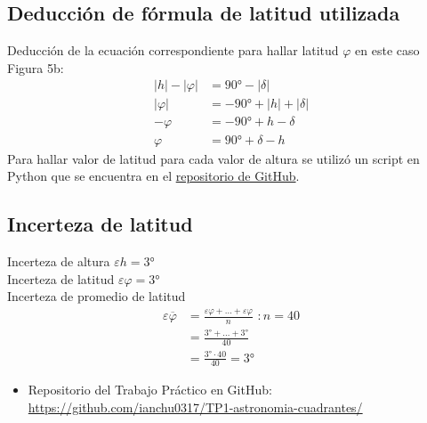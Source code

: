 \documentclass[11pt, a4paper]{article} %
\begin{document}
\subsection{Deducción de fórmula de latitud utilizada}
Deducción de la ecuación correspondiente para hallar latitud $\varphi$ en este caso Figura 5b:
\begin{align*}
    |h|-|\varphi| &= \ang{90}-|\delta| \\
    |\varphi| &= -\ang{90}+|h|+|\delta| \\
    -\varphi &= -\ang{90} + h - \delta \\
    \varphi &= \ang{90} + \delta - h
\end{align*}
Para hallar valor de latitud para cada valor de altura se utilizó un script en Python que se encuentra en el \href{https://github.com/ianchu0317/TP1-astronomia-cuadrantes/tree/main}{repositorio de GitHub}.

\subsection{Incerteza de latitud}
Incerteza de altura $\varepsilon h = \ang{3}$\\[6pt]
Incerteza de latitud $\varepsilon \varphi = \ang{3}$\\[6pt]
Incerteza de promedio de latitud 
\begin{align*}
    \displaystyle \varepsilon \overline{\varphi} &= \frac{\varepsilon \varphi + \dots + \varepsilon \varphi}{n}\,\, : n=40\\[6pt]
    &= \frac{\ang{3} + \dots + \ang{3}}{40}\\[6pt]
    &= \frac{\ang{3} \cdot 40}{40} = \ang{3}
\end{align*}



\vspace{0.5cm}
\hline


\begin{itemize}
    \item Repositorio del Trabajo Práctico en GitHub: \url{https://github.com/ianchu0317/TP1-astronomia-cuadrantes/} 
\end{itemize}
\end{document}
